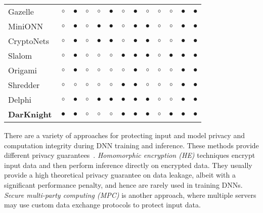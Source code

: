 \begin{table*}[htb]
{\begin{tabular}{lcccccccccccc}
	
	Gazelle~\citep{juvekar2018gazelle} &$\circ$ &$\bullet$  &$\circ$  & $\circ$ & $\bullet$ &$\circ$&$\bullet$&$\circ$&$\circ$&$\circ$&$\bullet$&$\bullet$\\
	MiniONN~\citep{liu2017oblivious} &$\circ$ &$\bullet$  & $\circ$ & $\bullet$ & $\bullet$ &$\circ$&$\bullet$&$\bullet$&$\circ$&$\circ$&$\bullet$&$\bullet$\\
	CryptoNets~\citep{gilad2016cryptonets} &$\circ$ &$\bullet$  & $\circ$ & $\bullet$ & $\bullet$ &$\circ$&$\bullet$&$\bullet$&$\circ$&$\circ$&$\bullet$&$\bullet$\\
	Slalom~\citep{tramer2018slalom} &$\circ$ &$\bullet$  & $\circ$ & $\circ$ &$\circ$ & $\bullet$ & $\bullet$ &$\bullet$ &$\circ$&$\bullet$&$\bullet$&$\bullet$\\
	Origami~\citep{narra2019privacy} & $\circ$&$\bullet$  & $\circ$ & $\circ$ & $\circ$& $\circ$ & $\bullet$ &$\circ$&$\circ$&$\circ$&$\bullet$&$\bullet$ \\
	Shredder~\citep{mireshghallah2020shredder} & $\circ$&$\circ$  & $\circ$ & $\circ$ & $\circ$& $\bullet$ & $\bullet$ &$\circ$&$\circ$&$\circ$&$\bullet$&$\bullet$ \\
	Delphi~\citep{mishra2020delphi} & $\circ$&$\bullet$  & $\circ$ & $\bullet$ & $\bullet$&$\bullet$ & $\bullet$&$\bullet$&$\circ$&$\circ$&$\bullet$&$\bullet$ \\
	\textbf{DarKnight} & $\bullet$&$\bullet$  &$\circ$ & $\circ$ &$\circ$ &$\bullet$ &$\bullet$  &$\bullet$ &$\circ$&$\bullet$ &$\bullet$&$\bullet$\\
	\hline
\end{tabular}
}
\vskip -0.1mm
\end{table*}
There are a variety of approaches for protecting input and model privacy and computation integrity during DNN training and inference. These methods provide different privacy guarantees~\cite{mirshghallah2020privacy}. \textit{Homomorphic encryption (HE)} techniques encrypt input data and then perform inference directly on encrypted data. They usually provide a high theoretical privacy guarantee on data leakage, albeit with a significant performance penalty, and hence are rarely used in training DNNs. %
\textit{Secure multi-party computing (MPC)} is another approach, where multiple servers may use custom data exchange protocols to protect input data. %
